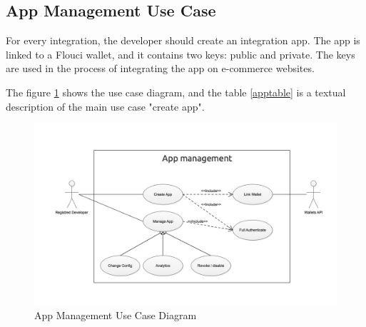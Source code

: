\begin{spacing}{1.2}
\subsection{App Management Use Case}
For every integration, the developer should create an integration app.
The app is linked to a Flouci wallet, and it contains two keys: public and private.
The keys are used in the process of integrating the app on e-commerce websites.


The figure \ref{appmanagementusecase} shows the use case diagram, and the table \ref{apptable} is a textual description of the main use case "create app".
\begin{figure}[H]\centering
\includegraphics[scale=0.3]{appusecase.png}
\caption{App Management Use Case Diagram}
\label{appmanagementusecase}
\end{figure}


\end{spacing}
